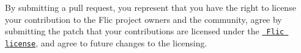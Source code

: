 By submitting a pull request, you represent that you have the right to license your contribution to the Flic project owners and the community, agree by submitting the patch that your contributions are licensed under the \href{https://raw.githubusercontent.com/aseprite/flic/main/LICENSE.txt}{\texttt{ Flic license}}, and agree to future changes to the licensing. 